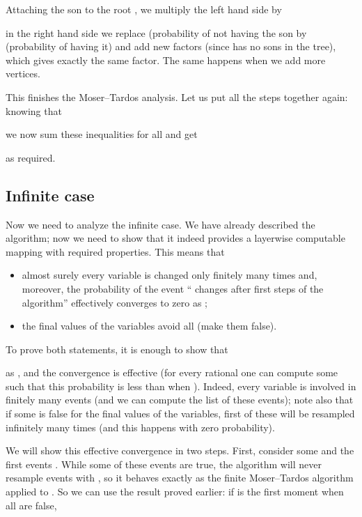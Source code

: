 \documentclass[12pt]{article}
\begin{document}
Attaching the son  to the root , we multiply the left hand side by
   
in the right hand side we replace  (probability of not having the son  by  (probability of having it) and add new factors  (since  has no sons in the tree), which gives exactly the same factor. The same happens when we add more vertices.

This finishes the Moser--Tardos analysis. Let us put all the steps together again: knowing that

we now sum these inequalities for all  and get

as required.
\smallskip

\subsection{Infinite case}

Now we need to analyze the infinite case. We have already described the algorithm; now we need to show that it indeed provides a layerwise computable mapping with required properties. This means that

\begin{itemize}

\item
almost surely every variable  is changed only finitely many times and, moreover, the probability of the event `` changes after first  steps of the algorithm'' effectively converges to zero as ;

\item
the final values of the variables avoid all  (make them false).

\end{itemize}

To prove both statements, it is enough to show that

as , and the convergence is effective (for every rational  one can compute some  such that this probability is less than  when ). Indeed, every variable is involved in finitely many events (and we can compute the list of these events); note also that if some  is false for the final values of the variables, first of these  will be resampled infinitely many times (and this happens with zero probability).

We will show this effective convergence in two steps. First, consider some  and the first  events . While some of these events are true, the algorithm will never resample events  with , so it behaves exactly as the finite Moser--Tardos algorithm applied to . So we can use the result proved earlier: if  is the first moment when all  are false,
	
\end{document}
